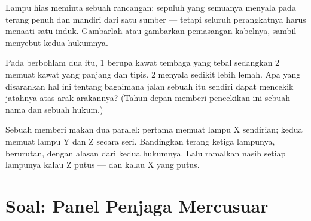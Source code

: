 \begin{exercise}[$\star\star$]\label{exo:g7:circuits-series-parallel:10}
Lampu hias meminta sebuah rancangan: sepuluh  yang semuanya
menyala pada terang penuh dan mandiri dari satu sumber --- tetapi
seluruh perangkatnya harus menaati satu  induk. Gambarlah atau
gambarkan pemasangan kabelnya, sambil menyebut kedua hukumnya.
\end{exercise}

\begin{exercise}[$\star\star$]\label{exo:g7:circuits-series-parallel:11}
Pada  berbohlam dua itu,   1 berupa kawat
tembaga yang tebal sedangkan   2 memuat kawat yang panjang
dan tipis.  2 menyala sedikit lebih lemah. Apa yang disarankan
hal ini tentang bagaimana jalan sebuah  itu sendiri dapat
mencekik jatahnya atas arak-arakannya? (Tahun depan memberi
pencekikan ini sebuah nama dan sebuah hukum.)
\end{exercise}

\begin{exercise}[$\star\star\star$]\label{exo:g7:circuits-series-parallel:12}
Sebuah  memberi makan dua  paralel:  pertama
memuat lampu X sendirian;  kedua memuat lampu Y dan Z secara
seri. Bandingkan terang ketiga lampunya, berurutan, dengan alasan dari
kedua hukumnya. Lalu ramalkan nasib setiap lampunya kalau Z putus ---
dan kalau X yang putus.
\end{exercise}

\section{Soal: Panel Penjaga Mercusuar}


